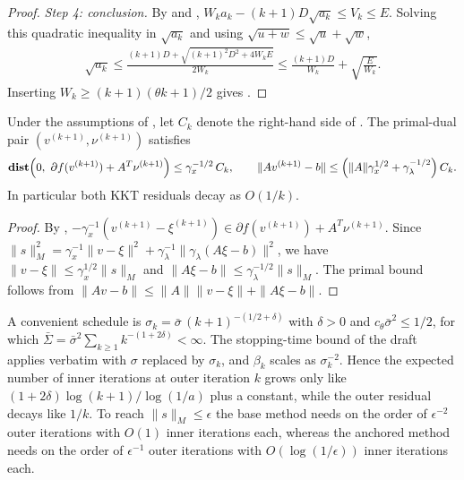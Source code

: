 \begin{proof}
    \emph{Step 4: conclusion.}
    By  and , $W_k a_k - (k+1)D\sqrt{a_k} \le V_k \le E$.
    Solving this quadratic inequality in $\sqrt{a_k}$ and using $\sqrt{u + w} \le \sqrt u + \sqrt w$,
    \begin{align}
        \sqrt{a_k} \le \frac{(k+1)D + \sqrt{(k+1)^2D^2 + 4W_kE}}{2W_k} \le \frac{(k+1)D}{W_k} + \sqrt{\frac{E}{W_k}}.
    \end{align}
    Inserting $W_k \ge (k+1)(\theta k+1)/2$ gives .
\end{proof}

\begin{corollary}\label{cor:acc-kkt}
    Under the assumptions of , let $C_k$ denote the right-hand side of .
    The primal-dual pair $(v^{(k+1)}, \nu^{(k+1)})$ satisfies
    \begin{align}
        \mathop{\bf dist{}}\!\left(0,\ \partial f(v^{(k+1)}) + A^T\nu^{(k+1)}\right) \le \gamma_x^{-1/2}\, C_k,
        \qquad
        \|A v^{(k+1)} - b\| \le \left(\|A\|\gamma_x^{1/2} + \gamma_\lambda^{-1/2}\right) C_k .
    \end{align}
    In particular both KKT residuals decay as $O(1/k)$.
\end{corollary}
\begin{proof}
    By , $-\gamma_x^{-1}(v^{(k+1)} - \xi^{(k+1)}) \in \partial f(v^{(k+1)}) + A^T\nu^{(k+1)}$.
    Since $\|s\|_M^2 = \gamma_x^{-1}\|v - \xi\|^2 + \gamma_\lambda^{-1}\|\gamma_\lambda(A\xi - b)\|^2$, we have $\|v - \xi\| \le \gamma_x^{1/2}\|s\|_M$ and $\|A\xi - b\| \le \gamma_\lambda^{-1/2}\|s\|_M$.
    The primal bound follows from $\|Av - b\| \le \|A\|\|v - \xi\| + \|A\xi - b\|$.
\end{proof}

\begin{remark}\label{rem:acc-inner-work}
    A convenient schedule is $\sigma_k = \bar\sigma\,(k+1)^{-(1/2+\delta)}$ with $\delta > 0$ and $c_\theta\bar\sigma^2 \le 1/2$, for which $\bar\Sigma = \bar\sigma^2\sum_{k\ge 1}k^{-(1+2\delta)} < \infty$.
    The stopping-time bound of the draft applies verbatim with $\sigma$ replaced by $\sigma_k$, and $\beta_k$ scales as $\sigma_k^{-2}$.
    Hence the expected number of inner iterations at outer iteration $k$ grows only like $(1+2\delta)\log(k+1)/\log(1/a)$ plus a constant, while the outer residual decays like $1/k$.
    To reach $\|s\|_M \le \epsilon$ the base method needs on the order of $\epsilon^{-2}$ outer iterations with $O(1)$ inner iterations each, whereas the anchored method needs on the order of $\epsilon^{-1}$ outer iterations with $O(\log(1/\epsilon))$ inner iterations each.
\end{remark}

